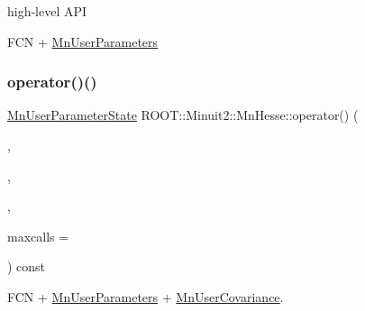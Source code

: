 high-\/level A\+PI

F\+CN + \mbox{\hyperlink{classROOT_1_1Minuit2_1_1MnUserParameters}{Mn\+User\+Parameters}} \mbox{\label{classROOT_1_1Minuit2_1_1MnHesse_aeba6a2c85b9bda7785d418a6e2605722}} 
\subsubsection{\texorpdfstring{operator()()}{operator()()}\hspace{0.1cm}{\footnotesize\ttfamily [13/24]}}
{\footnotesize\ttfamily \mbox{\hyperlink{classROOT_1_1Minuit2_1_1MnUserParameterState}{Mn\+User\+Parameter\+State}} R\+O\+O\+T\+::\+Minuit2\+::\+Mn\+Hesse\+::operator() (\begin{DoxyParamCaption}\item[{const \mbox{\hyperlink{classROOT_1_1Minuit2_1_1FCNBase}{F\+C\+N\+Base}} \&}]{,  }\item[{const \mbox{\hyperlink{classROOT_1_1Minuit2_1_1MnUserParameters}{Mn\+User\+Parameters}} \&}]{,  }\item[{const \mbox{\hyperlink{classROOT_1_1Minuit2_1_1MnUserCovariance}{Mn\+User\+Covariance}} \&}]{,  }\item[{unsigned int}]{maxcalls = {} }\end{DoxyParamCaption}) const}



F\+CN + \mbox{\hyperlink{classROOT_1_1Minuit2_1_1MnUserParameters}{Mn\+User\+Parameters}} + \mbox{\hyperlink{classROOT_1_1Minuit2_1_1MnUserCovariance}{Mn\+User\+Covariance}}. 

\mbox{\label{classROOT_1_1Minuit2_1_1MnHesse_aeba6a2c85b9bda7785d418a6e2605722}} 
